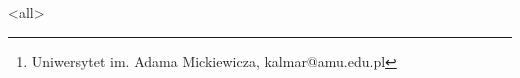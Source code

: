 \author{Opracowanie: Marek Kaluba\thanks{Uniwersytet im. Adama 
Mickiewicza, kalmar@amu.edu.pl}}
\date{2013}


\mode<all>

%
% 
% 
% 

%  
%  
% 
% 
%  
%  
 
% 
% 
% 
%  
% 






